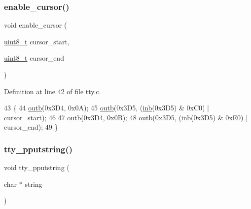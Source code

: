 \subsubsection{\texorpdfstring{enable\+\_\+cursor()}{enable\_cursor()}}
{\footnotesize\ttfamily void enable\+\_\+cursor (\begin{DoxyParamCaption}\item[{\hyperlink{a00125_aba7bc1797add20fe3efdf37ced1182c5_aba7bc1797add20fe3efdf37ced1182c5}{uint8\+\_\+t}}]{cursor\+\_\+start,  }\item[{\hyperlink{a00125_aba7bc1797add20fe3efdf37ced1182c5_aba7bc1797add20fe3efdf37ced1182c5}{uint8\+\_\+t}}]{cursor\+\_\+end }\end{DoxyParamCaption})}



Definition at line 42 of file tty.\+c.


\begin{DoxyCode}
43 \{
44     \hyperlink{a00140_aa37f5841c54156a4b14fc0d6f626b44f_aa37f5841c54156a4b14fc0d6f626b44f}{outb}(0x3D4, 0x0A);
45     \hyperlink{a00140_aa37f5841c54156a4b14fc0d6f626b44f_aa37f5841c54156a4b14fc0d6f626b44f}{outb}(0x3D5, (\hyperlink{a00140_a0223c8898dfec29069879dc51076e28a_a0223c8898dfec29069879dc51076e28a}{inb}(0x3D5) & 0xC0) | cursor\_start);
46  
47     \hyperlink{a00140_aa37f5841c54156a4b14fc0d6f626b44f_aa37f5841c54156a4b14fc0d6f626b44f}{outb}(0x3D4, 0x0B);
48     \hyperlink{a00140_aa37f5841c54156a4b14fc0d6f626b44f_aa37f5841c54156a4b14fc0d6f626b44f}{outb}(0x3D5, (\hyperlink{a00140_a0223c8898dfec29069879dc51076e28a_a0223c8898dfec29069879dc51076e28a}{inb}(0x3D5) & 0xE0) | cursor\_end);
49 \}
\end{DoxyCode}
\mbox{\label{a00149_ade960b1320324706aac6c00cc6b1b2fe_ade960b1320324706aac6c00cc6b1b2fe}} 
\subsubsection{\texorpdfstring{tty\+\_\+pputstring()}{tty\_pputstring()}}
{\footnotesize\ttfamily void tty\+\_\+pputstring (\begin{DoxyParamCaption}\item[{char $\ast$}]{string }\end{DoxyParamCaption})}



